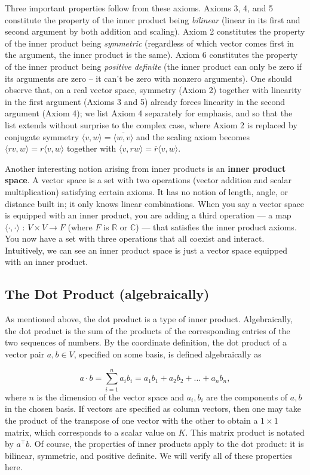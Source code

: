 \documentclass{article}
\begin{document}
Three important properties follow from these axioms. Axioms 3, 4, and 5 constitute the property of the inner product being \textit{bilinear} (linear in its first and second argument by both addition and scaling). Axiom 2 constitutes the property of the inner product being \textit{symmetric} (regardless of which vector comes first in the argument, the inner product is the same). Axiom 6 constitutes the property of the inner product being \textit{positive definite} (the inner product can only be zero if its arguments are zero -- it can't be zero with nonzero arguments). One should observe that, on a real vector space, symmetry (Axiom 2) together with linearity in the first argument (Axioms 3 and 5) already forces linearity in the second argument (Axiom 4); we list Axiom 4 separately for emphasis, and so that the list extends without surprise to the complex case, where Axiom 2 is replaced by conjugate symmetry $\langle v, w \rangle = \overline{\langle w, v \rangle}$ and the scaling axiom becomes $\langle r v, w \rangle = r \langle v, w \rangle$ together with $\langle v, r w \rangle = \overline{r} \langle v, w \rangle$.

Another interesting notion arising from inner products is an \textbf{inner product space}. A vector space is a set with two operations (vector addition and scalar multiplication) satisfying certain axioms. It has no notion of length, angle, or distance built in; it only knows linear combinations. When you say a vector space is equipped with an inner product, you are adding a third operation — a map $\langle \cdot,\cdot \rangle$ : $V \times V \rightarrow F$ (where $F$ is $\mathbb{R}$ or $\mathbb{C}$) — that satisfies the inner product axioms. You now have a set with three operations that all coexist and interact. Intuitively, we can see an inner product space is just a vector space equipped with an inner product. 

\subsection{The Dot Product (algebraically)}

As mentioned above, the dot product is a type of inner product. Algebraically, the dot product is the sum of the products of the corresponding entries of the two sequences of numbers. By the coordinate definition, the dot product of a vector pair $a,b \in V$, specified on some basis, is defined algebraically as 

$$a \cdot b = \sum_{i=1}^n a_i b_i = a_1 b_1 + a_2 b_2 + \dots + a_n b_n,$$
where $n$ is the dimension of the vector space and $a_i, b_i$ are the components of $a, b$ in the chosen basis. If vectors are specified as column vectors, then one may take the product of the transpose of one vector with the other to obtain a $1 \times 1$ matrix, which corresponds to a scalar value on $K$. This matrix product is notated by $a^\top b$. Of course, the properties of inner products apply to the dot product: it is bilinear, symmetric, and positive definite. We will verify all of these properties here.
\end{document}
